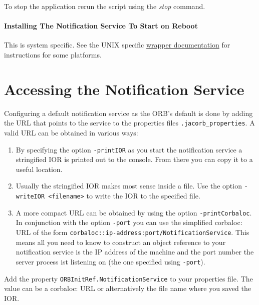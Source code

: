  To stop the application rerun the script using the \emph{stop} command.

 
 \paragraph{Installing The Notification Service To Start on Reboot}
 \label{sec:inst-appl-start}

 This is system specific. See the UNIX specific
 \href{http://wrapper.tanukisoftware.org/doc/english/launch-nix.html}{wrapper
   documentation} for instructions for some platforms.

\section{Accessing the Notification Service}
\label{sec:access-notif-serv}

Configuring a default notification service as the ORB's default is done
by adding the URL that points to the service to the properties files
\texttt{.jacorb\_properties}. A valid URL can be obtained in various ways:

\begin{enumerate}
\item By specifying the option \texttt{-printIOR} as you start the
  notification service a stringified IOR is printed out to the
  console. From there you can copy it to a useful location.

\item Usually the stringified IOR makes most sense inside a file. Use
  the option \texttt{-writeIOR <filename>} to write the IOR to the specified
  file.

\item A more compact URL can be obtained by using the
  option \texttt{-printCorbaloc}. In conjunction with the option
  \texttt{-port} you can use the simplified corbaloc: URL of the form
  \texttt{corbaloc::ip-address:port/NotificationService}. This means
  all you need to know to construct an object reference to your
  notification service is the IP address of the machine and the port
  number the server process ist listening on (the one specified using
  \texttt{-port}). 

\end{enumerate}

Add the property \texttt{ORBInitRef.NotificationService} to your
properties file. The value can be a corbaloc: URL or alternatively the
file name where you saved the IOR.

